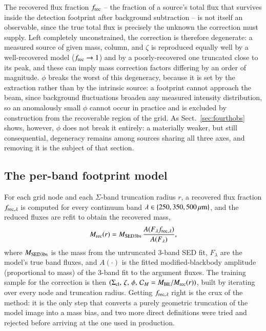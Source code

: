 \documentclass{aa}
\newcommand{\Scloud}{\Sigma_{\rm cl}}
\newcommand{\CM}{\mathcal{C}_{M}}
\newcommand{\Mbe}{M_{\rm BE}}
\newcommand{\Mrec}{M_{\rm rec}}
\begin{document}
The recovered flux fraction $f_{\rm rec}$ -- the fraction of a source's
total flux that survives inside the detection footprint after background
subtraction -- is not itself an observable, since the true total flux is
precisely the unknown the correction must supply. Left completely
unconstrained, the correction is therefore degenerate: a measured source
of given mass, column, and $\zeta$ is reproduced equally well by a
well-recovered model ($f_{\rm rec}\to1$) and by a poorly-recovered one
truncated close to its peak, and these can imply mass correction factors
differing by an order of magnitude. $\phi$ breaks the worst of this
degeneracy, because it is set by the extraction rather than by the intrinsic
source: a footprint cannot approach the beam, since background fluctuations
broaden any measured intensity distribution, so an anomalously small
$\phi$ cannot occur in practice and is excluded by construction from
the recoverable region of the grid. As Sect.~\ref{sec:fourthobs} shows,
however, $\phi$ does not break it entirely: a materially weaker, but
still consequential, degeneracy remains among sources sharing all three
axes, and removing it is the subject of that section.

\subsection{The per-band footprint model}
\label{sec:footprint}

For each grid node and each $\Sigma$-band truncation radius $r$, a recovered
flux fraction $f_{{{\rm rec}},\lambda}$ is computed for every continuum band
$\lambda\in\{250,350,500\,\mu{{\rm m}}\}$, and the reduced fluxes are refit
to obtain the recovered mass,
\begin{equation}
  \Mrec(r) = M_{\rm SED3bs} \,
  \frac{A(F_\lambda f_{{{\rm rec}},\lambda})}{A(F_\lambda)},
  \label{eq:mrec}
\end{equation}
where $M_{\rm SED3bs}$ is the mass from the untruncated 3-band SED fit,
$F_\lambda$ are the model's true band fluxes, and $A(\cdot)$ is the fitted
modified-blackbody amplitude (proportional to mass) of the 3-band fit to
the argument fluxes. The training sample for the correction is then
$(\Scloud,\,\zeta,\,\phi,\,\CM=\Mbe/\Mrec(r))$,
built by iterating over every node and truncation radius. Getting
$f_{{{\rm rec}},\lambda}$ right is the crux of the method: it is the only
step that converts a purely geometric truncation of the model image into a
mass bias, and two more direct definitions were tried and rejected before
arriving at the one used in production.
\end{document}
